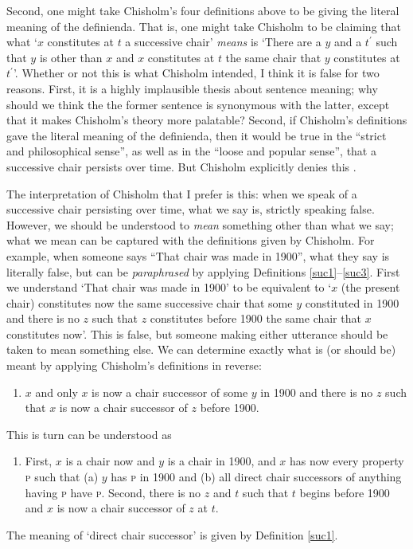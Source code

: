 \documentclass[11pt]{article}
\begin{document}
\begin{spacing}{1.5}
Second, one might take Chisholm's four definitions above to be giving
the literal meaning of the definienda.  That is, one might take
Chisholm to be claiming that what `$x$ constitutes at $t$ a successive
chair' {\em means} is `There are a $y$ and a $t^{\prime}$ such that
$y$ is other than $x$ and $x$ constitutes at $t$ the same chair that
$y$ constitutes at $t^{\prime}$'.  Whether or not this is what
Chisholm intended, I think it is false for two reasons.  First, it is
a highly implausible thesis about sentence meaning; why should we
think the the former sentence is synonymous with the latter, except
that it makes Chisholm's theory more palatable?  Second, if Chisholm's
definitions gave the literal meaning of the definienda, then it would
be true in the ``strict and philosophical sense'', as well as in the
``loose and popular sense'', that a successive chair persists over
time.  But Chisholm explicitly denies this
\citeyearpar[96--97]{chisholm1979}.

The interpretation of Chisholm that I prefer is this: when we speak of
a successive chair persisting over time, what we say is, strictly
speaking false.  However, we should be understood to {\em mean}
something other than what we say; what we mean can be captured with
the definitions given by Chisholm.  For example, when someone says
``That chair was made in 1900'', what they say is literally false, but
can be {\em paraphrased} by applying Definitions
\ref{suc1}--\ref{suc3}.  First we understand `That chair was made in
1900' to be equivalent to `$x$ (the present chair) constitutes now the
same successive chair that some $y$ constituted in 1900 and there is
no $z$ such that $z$ constitutes before 1900 the same chair that $x$
constitutes now'.  This is false, but someone making either utterance
should be taken to mean something else.  We can determine exactly what
is (or should be) meant by applying Chisholm's definitions in reverse:

\begin{enumerate}[start=3]
  \item $x$ and only $x$ is now a chair successor of some $y$ in 1900
    and there is no $z$ such that $x$ is now a chair successor of $z$
    before 1900.
\end{enumerate}
This is turn can be understood as

\begin{enumerate}[start=2]
  \item First, $x$ is a chair now and $y$ is a chair in 1900, and $x$
    has now every property \textsc{p} such that (a) $y$ has \textsc{p}
    in 1900 and (b) all direct chair successors of anything having
    \textsc{p} have \textsc{p}.  Second, there is no $z$ and $t$ such
    that $t$ begins before 1900 and $x$ is now a chair successor of
    $z$ at $t$.
\end{enumerate}
The meaning of `direct chair successor' is given by Definition
\ref{suc1}.


\end{spacing}
\end{document}
